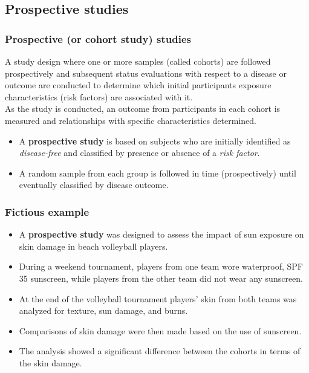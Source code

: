 \documentclass[a4paper]{article}
\begin{document}
\subsection{Prospective studies}
\subsubsection{Prospective (or cohort study) studies}
A study design where one or more samples (called cohorts) are followed prospectively and subsequent status evaluations with respect to a disease or outcome are conducted to determine which initial participants exposure characteristics (risk factors) are associated with it.\\
As the study is conducted, an outcome from participants in each cohort is measured and relationships with specific characteristics determined.
\begin{goldbox}
\begin{itemize}
	\item A \textbf{prospective study} is based on subjects who are initially identified as \textit{disease-free} and classified by presence or absence of a \textit{risk factor}.
	\item A random sample from each group is followed in time (prospectively) until eventually classified by disease outcome.
\end{itemize}
\end{goldbox}
\subsubsection{Fictious example}
\begin{itemize}
	\item A \textbf{prospective study }was designed to assess the impact of sun exposure on skin damage in beach volleyball players.
	\item During a weekend tournament, players from one team wore waterproof, SPF 35 sunscreen, while players from the other team did not wear any sunscreen.
	\item At the end of the volleyball tournament players' skin from both teams was analyzed for texture, sun damage, and burns.
	\item Comparisons of skin damage were then made based on the use of sunscreen.
	\item The analysis showed a significant difference between the cohorts in terms of the skin damage.
\end{itemize}
\end{document}
